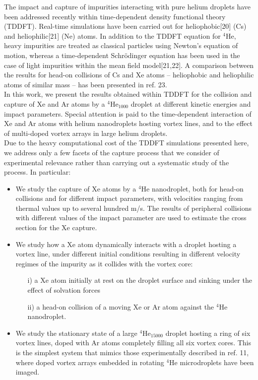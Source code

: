 		The impact and capture of impurities interacting with pure helium droplets have been addressed recently within time-dependent density functional theory (TDDFT). Real-time simulations have been carried out for heliophobic[20] (Cs) and heliophilic[21] (Ne) atoms. In addition to the TDDFT equation for $^4$He, heavy impurities are treated as classical particles using Newton's equation of motion, whereas a time-dependent Schr\"{o}dinger equation has been used in the case of light impurities within the mean field model[21,22]. A comparison between the results for head-on collisions of Cs and Xe atoms -- heliophobic and heliophilic atoms of similar mass -- has been presented in ref. 23.\\

		In this work, we present the results obtained within TDDFT for the collision and capture of Xe and Ar atoms by a $^4$He$_{1000}$ droplet at different kinetic energies and impact parameters. Special attention is paid to the time-dependent interaction of Xe and Ar atoms with helium nanodroplets hosting vortex lines, and to the effect of multi-doped vortex arrays in large helium droplets.\\

		Due to the heavy computational cost of the TDDFT simulations presented here, we address only a few facets of the capture process that we consider of experimental relevance rather than carrying out a systematic study of the process. In particular:
		\begin{itemize}
			\item We study the capture of Xe atoms by a $^4$He nanodroplet, both for head-on collisions and for different impact parameters, with velocities ranging from thermal values up to several hundred m/s. The results of peripheral collisions with different values of the impact parameter are used to estimate the cross section for the Xe capture.
			\item We study how a Xe atom dynamically interacts with a droplet hosting a vortex line, under different initial conditions resulting in different velocity regimes of the impurity as it collides with the vortex core: 
			\begin{enumerate}
				\item[i)] a Xe atom initially at rest on the droplet surface and sinking under the effect of solvation forces
				\item[ii)] a head-on collision of a moving Xe or Ar atom against the $^4$He nanodroplet.	
			\end{enumerate}
			\item We study the stationary state of a large $^4$He$_{15000}$ droplet hosting a ring of six vortex lines, doped with Ar atoms completely filling all six vortex cores. This is the simplest system that mimics those experimentally described in ref. 11, where doped vortex arrays embedded in rotating $^4$He microdroplets have been imaged.
		\end{itemize}

